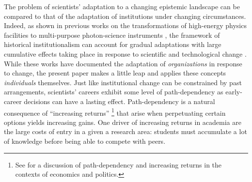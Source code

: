 \documentclass{article}
\begin{document}
The problem of scientists' adaptation to a changing epistemic landscape can be compared to that of the adaptation of institutions under changing circumstances. %
Indeed, as shown in previous works on the transformations of high-energy physics facilities to multi-purpose photon-science instruments  \citep{Hallonsten2013,Heinze2017a}, the framework of historical institutionalism can account for gradual adaptations with large cumulative effects taking place in response to scientific and technological change \citep{Heinze2012}. While these works have documented the adaptation of \textit{organizations} in response to change, the present paper makes a little leap and applies these concepts \textit{individuals} themselves.
Just like institutional change can be constrained by past arrangements, scientists' careers exhibit some level of path-dependency as early-career decisions can have a lasting effect. Path-dependency is a natural consequence of ``increasing returns'' \footnote{See \citealt{Pierson2000} for a discussion of path-dependency and increasing returns in the contexts of economics and politics.} that arise when perpetuating certain options yields increasing gains. One driver of increasing returns in academia are the large costs of entry \citep{Pierson2000} in a given a research area: students must accumulate a lot of knowledge before being able to compete with peers. 
\end{document}

